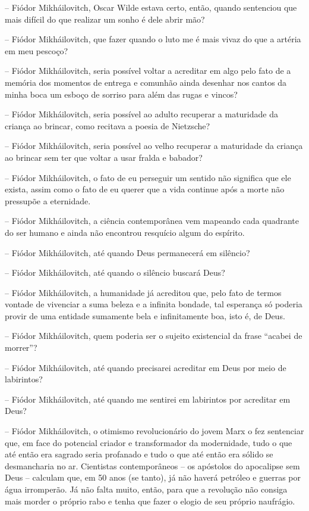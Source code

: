 -- Fiódor Mikháilovitch, Oscar Wilde estava certo, então, quando
sentenciou que mais difícil do que realizar um sonho é dele abrir mão?

-- Fiódor Mikháilovitch, que fazer quando o luto me é mais vivaz do que
a artéria em meu pescoço?

-- Fiódor Mikháilovitch, seria possível voltar a acreditar em algo pelo
fato de a memória dos momentos de entrega e comunhão ainda desenhar nos
cantos da minha boca um esboço de sorriso para além das rugas e vincos?

-- Fiódor Mikháilovitch, seria possível ao adulto recuperar a maturidade
da criança ao brincar, como recitava a poesia de Nietzsche?

-- Fiódor Mikháilovitch, seria possível ao velho recuperar a maturidade
da criança ao brincar sem ter que voltar a usar fralda e babador?

-- Fiódor Mikháilovitch, o fato de eu perseguir um sentido não significa
que ele exista, assim como o fato de eu querer que a vida continue após
a morte não pressupõe a eternidade.

-- Fiódor Mikháilovitch, a ciência contemporânea vem mapeando cada
quadrante do ser humano e ainda não encontrou resquício algum do
espírito.

-- Fiódor Mikháilovitch, até quando Deus permanecerá em silêncio?

-- Fiódor Mikháilovitch, até quando o silêncio buscará Deus?

-- Fiódor Mikháilovitch, a humanidade já acreditou que, pelo fato de
termos vontade de vivenciar a suma beleza e a infinita bondade, tal
esperança só poderia provir de uma entidade sumamente bela e
infinitamente boa, isto é, de Deus.

-- Fiódor Mikháilovitch, quem poderia ser o sujeito existencial da frase
``acabei de morrer''?

-- Fiódor Mikháilovitch, até quando precisarei acreditar em Deus por
meio de labirintos?

-- Fiódor Mikháilovitch, até quando me sentirei em labirintos por
acreditar em Deus?

-- Fiódor Mikháilovitch, o otimismo revolucionário do jovem Marx o fez
sentenciar que, em face do potencial criador e transformador da
modernidade, tudo o que até então era sagrado seria profanado e tudo o
que até então era sólido se desmancharia no ar. Cientistas
contemporâneos -- os apóstolos do apocalipse sem Deus -- calculam que,
em 50 anos (se tanto), já não haverá petróleo e guerras por água
irromperão. Já não falta muito, então, para que a revolução não consiga
mais morder o próprio rabo e tenha que fazer o elogio de seu próprio
naufrágio.

